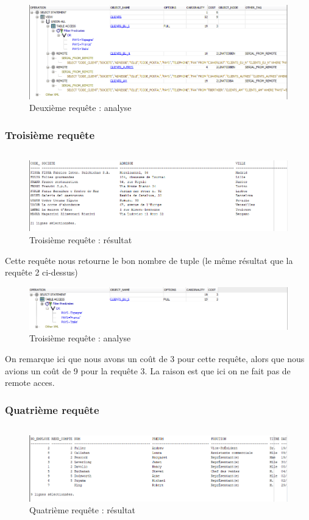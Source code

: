 \documentclass[10pt,a4paper]{article}
\theoremstyle{plain}
\begin{document}
\begin{figure}[!h]
    \centering
    \includegraphics[width=15cm]{EUS_req2_analyse.PNG}
    \caption{Deuxième requête : analyse}
\end{figure}
\newpage

\subsubsection{Troisième requête}
\inputminted{sql}{EUS_IV-A-3.sql}
\begin{figure}[!h]
    \centering
    \includegraphics[width=15cm]{EUS_req3.PNG}
    \caption{Troisième requête : résultat}
\end{figure}
Cette requête nous retourne le bon nombre de tuple (le même résultat que la requête 2 ci-dessus)

\begin{figure}[!h]
    \centering
    \includegraphics[width=15cm]{EUS_req3_analyse.PNG}
    \caption{Troisième requête : analyse}
\end{figure}
On remarque ici que nous avons un coût de 3 pour cette requête, alors que nous avions un coût de 9 pour la requête 3. La raison est que ici on ne fait pas de remote acces.
\newpage

\subsubsection{Quatrième requête}
\inputminted{sql}{EUS_IV-A-4.sql}
\begin{figure}[!h]
    \centering
    \includegraphics[width=15cm]{EUS_req4.PNG}
    \caption{Quatrième requête : résultat}
\end{figure}
\end{document}
